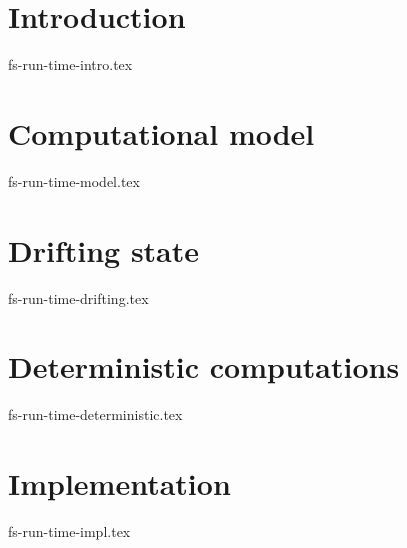 \documentclass[14pt]{matmex-diploma-custom}
\theoremstyle{remark}
\begin{document}
\begin{abstract}
In recent years, there has been a growth in research and industrial solutions in the field of distributed stream processing. However, even state-of-the-art stream processing systems are inconvenient to work with in some ways. Firstly, existing solutions suppose that the state of operations should be managed directly by a user, and that can be confusingly for inexperienced users of analytical processing systems. Secondly, these systems do not provide for deterministic processing by default. Furthermore, the most common approach for this feature is buffering. Its main problem is the extra cost for blocking before each order-sensitive operation. The goal of this paper is to propose a model, which addresses both recognized issues. On the one hand, our model stateless from the business logic perspective. Such behavior is obtained by the technique that allows a state to be a part of a stream. On the other hand, it is deterministic by design. We introduce an optimistic method that avoids buffering before each operation to achieve determinism with low overhead. The experiments show that prototype of our system requires a low extra cost for supporting proposed features and is able to outperform alternative industrial solutions in certain conditions.
\end {abstract}

\section* {Introduction}
 {fs-run-time-intro.tex}

\section {Computational model}
 {fs-run-time-model.tex}

\section{Drifting state}
 {fs-run-time-drifting.tex}

\section {Deterministic computations}
 {fs-run-time-deterministic.tex}

\section {Implementation}
 {fs-run-time-impl.tex}
\end{document}
